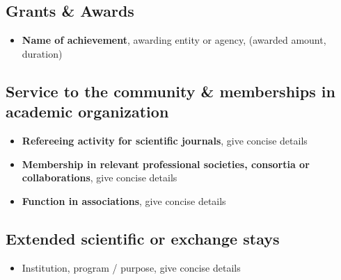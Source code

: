 \subsection*{Grants \& Awards}
\begin{itemize}
    
    \item \textbf{Name of achievement}, awarding entity or agency, (awarded amount, duration)
    
    
    
\end{itemize}



\subsection*{Service to the community \& memberships in academic organization}
\begin{itemize}

    \item \textbf{Refereeing activity for scientific journals}, give concise details

    \item \textbf{Membership in relevant professional societies, consortia or collaborations}, give concise details
    
    \item \textbf{Function in associations}, give concise details

\end{itemize}

\subsection*{Extended scientific or exchange stays}
\begin{itemize}

    \item Institution, program / purpose, give concise details

    
\end{itemize}

\newpage
